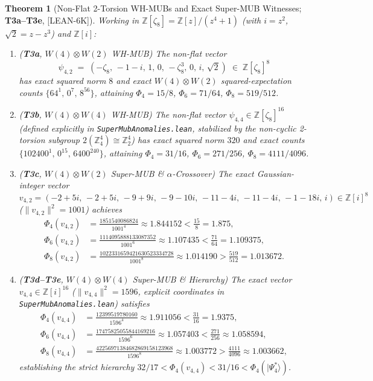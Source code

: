 \documentclass[11pt,reqno]{amsart}
\newtheorem{theorem}{Theorem}[section]
\theoremstyle{definition}
\newcommand{\Z}{\mathbb{Z}}
\newcommand{\taglean}{\textsf{[LEAN-6K]}}
\begin{document}
\begin{theorem}[Non-Flat 2-Torsion WH-MUBs and Exact Super-MUB Witnesses; \textbf{T3a--T3e}, \taglean]\label{thm:super-mub}
Working in $\Z[\zeta_8]=\Z[z]/(z^4+1)$ (with $i=z^2$, $\sqrt{2}=z-z^3$) and $\Z[i]$:
\begin{enumerate}[leftmargin=1.8em]
  \item \emph{(\textbf{T3a}, $W(4)\otimes W(2)$ WH-MUB)} The non-flat vector
  \[
    \psi_{4,2} \;=\; (-\zeta_8,\,-1-i,\,1,\,0,\,-\zeta_8^3,\,0,\,i,\,\sqrt{2}) \;\in\; \Z[\zeta_8]^8
  \]
  has exact squared norm $8$ and exact $W(4)\otimes W(2)$ squared-expectation counts
  $\{64^1,\,0^7,\,8^{56}\}$, attaining $\Phi_4=15/8$, $\Phi_6=71/64$, $\Phi_8=519/512$.
  \item \emph{(\textbf{T3b}, $W(4)\otimes W(4)$ WH-MUB)} The non-flat vector
  $\psi_{4,4}\in\Z[\zeta_8]^{16}$ (defined explicitly in \texttt{SuperMubAnomalies.lean},
  stabilized by the non-cyclic 2-torsion subgroup $2(\Z_4^4)\cong\Z_2^4$) has exact squared
  norm $320$ and exact counts $\{102400^1,\,0^{15},\,6400^{240}\}$, attaining
  $\Phi_4=31/16$, $\Phi_6=271/256$, $\Phi_8=4111/4096$.
  \item \emph{(\textbf{T3c}, $W(4)\otimes W(2)$ Super-MUB \& $\alpha$-Crossover)} The
  exact Gaussian-integer vector
  $v_{4,2}=(-2+5i,\,-2+5i,\,-9+9i,\,-9-10i,\,-11-4i,\,-11-4i,\,-1-18i,\,i)\in\Z[i]^8$
  ($\|v_{4,2}\|^2=1001$) achieves
  \begin{align*}
    \Phi_4(v_{4,2}) &= \frac{1851540086824}{1001^4} \approx 1.844152 < \frac{15}{8} = 1.875, \\
    \Phi_6(v_{4,2}) &= \frac{1114095888133087352}{1001^6} \approx 1.107435 < \frac{71}{64} = 1.109375, \\
    \Phi_8(v_{4,2}) &= \frac{1022331659421630523334728}{1001^8} \approx 1.014190 > \frac{519}{512} = 1.013672.
  \end{align*}
  \item \emph{(\textbf{T3d--T3e}, $W(4)\otimes W(4)$ Super-MUB \& Hierarchy)} The exact
  vector $v_{4,4}\in\Z[i]^{16}$ ($\|v_{4,4}\|^2=1596$, explicit coordinates in
  \texttt{SuperMubAnomalies.lean}) satisfies
  \begin{align*}
    \Phi_4(v_{4,4}) &= \frac{12399519780160}{1596^4} \approx 1.911056 < \frac{31}{16} = 1.9375, \\
    \Phi_6(v_{4,4}) &= \frac{17475825055844169216}{1596^6} \approx 1.057403 < \frac{271}{256} \approx 1.058594, \\
    \Phi_8(v_{4,4}) &= \frac{42256971384682869158123968}{1596^8} \approx 1.003772 > \frac{4111}{4096} \approx 1.003662,
  \end{align*}
  establishing the strict hierarchy $32/17<\Phi_4(v_{4,4})<31/16<\Phi_4(|\Psi_4^*\rangle)$.
\end{enumerate}
\end{theorem}
\end{document}
